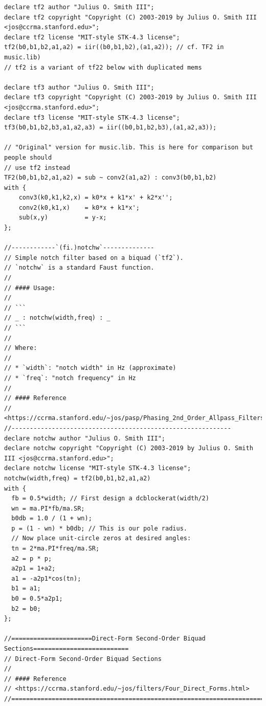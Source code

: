 \documentclass{article}
\begin{document}
\begin{lstlisting}[caption=\texttt{filters.lib}]
declare tf2 author "Julius O. Smith III";
declare tf2 copyright "Copyright (C) 2003-2019 by Julius O. Smith III <jos@ccrma.stanford.edu>";
declare tf2 license "MIT-style STK-4.3 license";
tf2(b0,b1,b2,a1,a2) = iir((b0,b1,b2),(a1,a2)); // cf. TF2 in music.lib)
// tf2 is a variant of tf22 below with duplicated mems

declare tf3 author "Julius O. Smith III";
declare tf3 copyright "Copyright (C) 2003-2019 by Julius O. Smith III <jos@ccrma.stanford.edu>";
declare tf3 license "MIT-style STK-4.3 license";
tf3(b0,b1,b2,b3,a1,a2,a3) = iir((b0,b1,b2,b3),(a1,a2,a3));

// "Original" version for music.lib. This is here for comparison but people should
// use tf2 instead
TF2(b0,b1,b2,a1,a2) = sub ~ conv2(a1,a2) : conv3(b0,b1,b2)
with {
	conv3(k0,k1,k2,x) = k0*x + k1*x' + k2*x'';
	conv2(k0,k1,x)    = k0*x + k1*x';
	sub(x,y)          = y-x;
};

//------------`(fi.)notchw`--------------
// Simple notch filter based on a biquad (`tf2`).
// `notchw` is a standard Faust function.
//
// #### Usage:
//
// ```
// _ : notchw(width,freq) : _
// ```
//
// Where:
//
// * `width`: "notch width" in Hz (approximate)
// * `freq`: "notch frequency" in Hz
//
// #### Reference
// <https://ccrma.stanford.edu/~jos/pasp/Phasing_2nd_Order_Allpass_Filters.html>
//------------------------------------------------------------
declare notchw author "Julius O. Smith III";
declare notchw copyright "Copyright (C) 2003-2019 by Julius O. Smith III <jos@ccrma.stanford.edu>";
declare notchw license "MIT-style STK-4.3 license";
notchw(width,freq) = tf2(b0,b1,b2,a1,a2)
with {
  fb = 0.5*width; // First design a dcblockerat(width/2)
  wn = ma.PI*fb/ma.SR;
  b0db = 1.0 / (1 + wn);
  p = (1 - wn) * b0db; // This is our pole radius.
  // Now place unit-circle zeros at desired angles:
  tn = 2*ma.PI*freq/ma.SR;
  a2 = p * p;
  a2p1 = 1+a2;
  a1 = -a2p1*cos(tn);
  b1 = a1;
  b0 = 0.5*a2p1;
  b2 = b0;
};

//======================Direct-Form Second-Order Biquad Sections==========================
// Direct-Form Second-Order Biquad Sections
//
// #### Reference
// <https://ccrma.stanford.edu/~jos/filters/Four_Direct_Forms.html>
//========================================================================================


\end{lstlisting}
\end{document}
